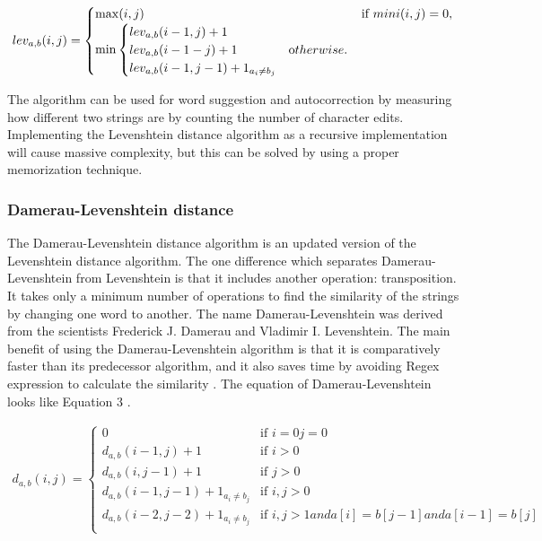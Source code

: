 \begin{equation}
	\begin{aligned}
		\label{eq:levdist}	
		lev_{a,b}(i,j) = 
		\begin{cases}
			\max(i,j) & \text {if } mini(i,j) = 0,\\    
			\min 
			\begin{cases}
				lev_{a,b}(i-1,j) + 1 \\
			    lev_{a,b}(i-1-j) + 1 & \text                     otherwise. \\ 
			    lev_{a,b}(i-1,j-1) + 1_{a_i\neq b_j} 	
			\end{cases}
		\end{cases}
	\end{aligned}
\end{equation}

The algorithm can be used for word suggestion and autocorrection by measuring how different two strings are by counting the number of character edits. Implementing the Levenshtein distance algorithm as a recursive implementation will cause massive complexity, but this can be solved by using a proper memorization technique.

\subsubsection{Damerau-Levenshtein distance}
The Damerau-Levenshtein distance algorithm is an updated version of the Levenshtein distance algorithm. The one difference which separates  Damerau-Levenshtein from Levenshtein is that it includes another operation: transposition. It takes only a minimum number of operations to find the similarity of the strings by changing one word to another. The name Damerau-Levenshtein was derived from the scientists Frederick J. Damerau and Vladimir I. Levenshtein. The main benefit of using the Damerau-Levenshtein algorithm is that it is comparatively faster than its predecessor algorithm, and it also saves time by avoiding Regex expression to calculate the similarity \cite{ChSa2019}. The equation of Damerau-Levenshtein looks like Equation 3 \cite{DamLeven}.

\begin{equation}
	\begin{aligned}
		\label{eq:dlevidist}	
		d_{a,b}(i,j) = 
		\begin{cases}
			0 & \text {if } i = 0 j = 0\\
			d_{a,b}(i-1,j) + 1 & \text {if } i > 0\\
			d_{a,b}(i,j-1) + 1 & \text {if } j > 0\\
			d_{a,b}(i-1,j-1) + 1_{a_i\neq b_j} & \text {if } i,j > 0\\
			d_{a,b}(i-2,j-2) + 1_{a_i\neq b_j} & \text {if } i,j > 1 and a[i] = b[j-1] and a[i-1] = b[j]\\
		\end{cases}
	\end{aligned}
\end{equation}

